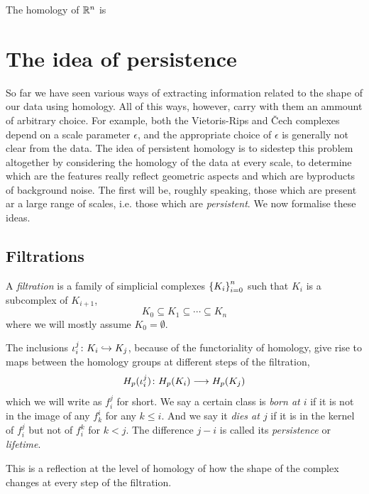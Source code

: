 \documentclass[../main.tex]{subfiles}
\begin{document}
The homology of \( \mathbb{R}^n \) is 

\section{The idea of persistence}
So far we have seen various ways of extracting information related to the shape of our
data using homology. All of this ways, however, carry with them an ammount of arbitrary
choice. For example, both the Vietoris-Rips and Čech complexes depend on a scale parameter
\( \epsilon \), and the appropriate choice of \( \epsilon \) is generally not clear from
the data. The idea of persistent homology is to sidestep this problem altogether by
considering the homology of the data at every scale, to determine which are the features
really reflect geometric aspects and which are byproducts of background noise. The first
will be, roughly speaking, those which are present ar a large range of scales, i.e. those
which are \emph{persistent}. We now formalise these ideas.

\subsection{Filtrations}
\begin{definition}[Filtration]
	A \emph{filtration} is a family of simplicial complexes \( \left\{ K_i \right\}_{i = 0}^n \)	such
	that \( K_i \) is a subcomplex of \( K_{i+1} \),
	\begin{equation*}
		K_0 \subseteq K_1 \subseteq \cdots \subseteq K_n
	\end{equation*}
	where we will mostly assume \( K_0 = \emptyset \). 
\end{definition}
The inclusions \( \iota_i^j \colon K_i \hookrightarrow K_j \), because of the functoriality of homology, give
rise to maps between the homology groups at different steps of the filtration,
\begin{equation*}
	H_p(\iota_i^j) \colon H_p(K_i) \longrightarrow H_p(K_j)
\end{equation*}
which we will write as \( f_i^j \) for short. We say a certain class is \emph{born at \( i
\)} if it is not in the image of any \( f_k^i \) for any \( k \leq i \). And we say it
\emph{dies at \( j \)} if it is in the kernel of \( f_i^j \) but not of \( f_i^k \) for \(
k < j \). The difference \( j - i \) is called its \emph{persistence} or \emph{lifetime}. 

This is a reflection at the level of homology of how the shape of the complex changes at
every step of the filtration. 
\end{document}
